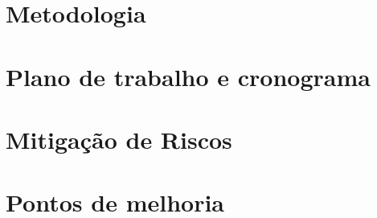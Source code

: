 \documentclass[11pt,a4paper]{article}
\theoremstyle{definition}
\begin{document}


\section{Metodologia}
\label{sec:metodologia}



\section{Plano de trabalho e cronograma}
\label{sec:plano_de_trabalho_cronograma}



\section{Mitigação de Riscos}
\label{sec:mitigacao_de_riscos}



\section{Pontos de melhoria}
\end{document}
